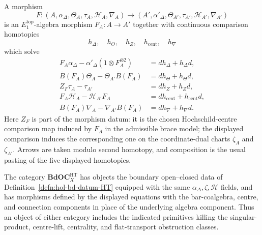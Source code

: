\begin{defn}
A morphism
\[
  F\colon
  (A,\alpha_\Delta,\Theta_A,\tau_A,\mathcal H_A,\nabla_A)
  \longrightarrow
  (A',\alpha'_\Delta,\Theta_{A'},\tau_{A'},\mathcal H_{A'},\nabla_{A'})
\]
is an \(E_1^{\mathrm{top}}\)-algebra morphism \(F_A:A\to A'\)
together with continuous comparison homotopies
\[
  h_\Delta,\quad h_\Theta,\quad h_Z,\quad h_{\mathrm{cent}},\quad
  h_\nabla
\]
which solve
\[
\begin{aligned}
  F_A\alpha_\Delta-\alpha'_\Delta(1\otimes F_A^{\otimes2})
    &=d h_\Delta+h_\Delta d,\\
  \bar B(F_A)\Theta_A-\Theta_{A'}\bar B(F_A)
    &=d h_\Theta+h_\Theta d,\\
  Z_F\tau_A-\tau_{A'}
    &=d h_Z+h_Zd,\\
  F_A\mathcal H_A-\mathcal H_{A'}F_A
    &=d h_{\mathrm{cent}}+h_{\mathrm{cent}}d,\\
  \bar B(F_A)\nabla_A-\nabla_{A'}\bar B(F_A)
    &=d h_\nabla+h_\nabla d .
\end{aligned}
\]
Here \(Z_F\) is part of the morphism datum: it is the chosen
Hochschild-centre comparison map induced by \(F_A\) in the admissible
brace model; the displayed comparison induces the corresponding one on
the coordinate-dual charts \(\zeta_A\) and \(\zeta_{A'}\).  Arrows are
taken modulo second homotopy, and composition
is the usual pasting of the five displayed homotopies.

The category \(\mathbf{BdOC}^{\mathrm{HT}}_X\) has objects the boundary
open--closed data of Definition~\ref{defn:hol-bd-datum-HT} equipped
with the same \(\alpha_\Delta,\zeta,\mathcal H\) fields, and has
morphisms defined by the displayed equations with the bar-coalgebra,
centre, and connection components in place of the underlying algebra
component.  Thus an object of either category includes the indicated
primitives killing the singular-product, centre-lift, centrality, and
flat-transport obstruction classes.
\end{defn}

